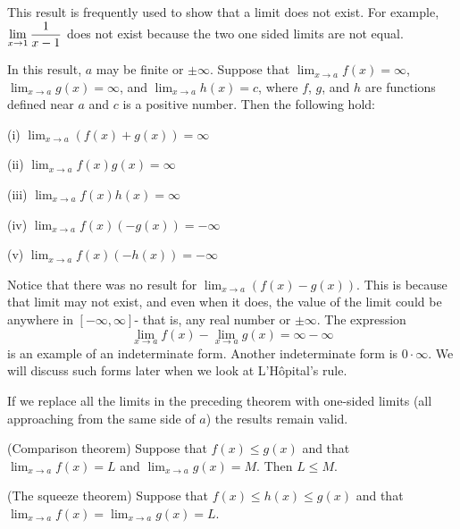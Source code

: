 This result is frequently used to show that a limit does not exist. For example, $
 \displaystyle{\lim _{x\to 1} {1\over x-1}  }$ does not exist because the two one sided limits are not equal.

 \thm In this result, $a$ may be finite or $\pm \infty $. Suppose that
  $\displaystyle{\lim _{x\to a} f(x)
 } =\infty $,  $\displaystyle{\lim _{x\to a} g(x)
 } =\infty $, and $ \displaystyle{\lim _{x\to a} h(x)
 } =c $, where $f$, $g$, and $h$ are functions defined near $a$ and $c$ is a positive number.
 Then the following hold:

\beginlist

\item{ (i)} $\displaystyle{\lim _{x\to a} (f(x) +g(x))
 } =\infty $

\item{ (ii)} $\displaystyle{\lim _{x\to a} f(x)g(x)
 } =\infty $

\item{ (iii)} $\displaystyle{\lim _{x\to a} f(x)h(x)
 } =\infty $

\item{(iv)} $\displaystyle{\lim _{x\to a} f(x)(-g(x))
 } =-\infty $


\item{ (v)} $\displaystyle{\lim _{x\to a} f(x)(-h(x))
 } =-\infty $

\endlist
\endthmnoproof

Notice that there was no result for $\displaystyle{\lim _{x\to a}
 (f(x) -g(x)) } $. This is because that limit may not exist, and even
 when it does, the value of the limit could be anywhere in $[-\infty ,
 \infty ] $- that is, any real number or $\pm \infty $. The expression
 $$ \displaystyle{\lim _{x\to a} f(x) } -\displaystyle{\lim _{x\to a}
 g(x) } =\infty -\infty $$ is an example of an 
{\dfont indeterminate form}. 
Another indeterminate form is $0\cdot \infty $. We will discuss
 such forms later when we look at
 L'H\^opital's rule.

If we replace all the limits in the preceding theorem with one-sided
limits (all approaching from the same side of $a$) the results remain
valid.

\thm (Comparison theorem)
Suppose that $f(x) \leq g(x) $ and that $\displaystyle{\lim _{x\to a} }f(x)=L $ and
 $\displaystyle{\lim _{x\to a} }g(x) =M $. Then  $L \leq M $.
\endthmnoproof

\thm (The squeeze theorem) 
Suppose that $f(x) \leq h(x) \leq g(x) $ and that
$\displaystyle{\lim _{x\to a} }f(x) =\displaystyle{\lim _{x\to a} }g(x)=L $.

